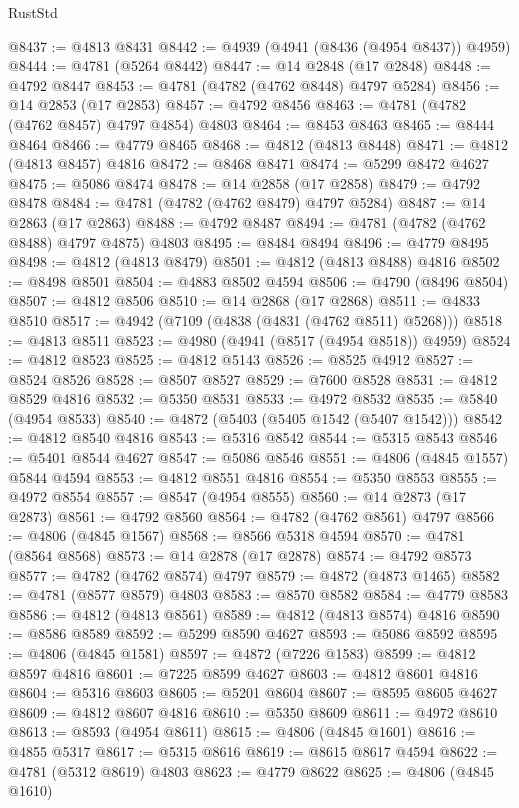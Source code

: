 \begin{lexlean}{RustStd}
\begin{coremodule}
@8437 := @4813 @8431
@8442 := @4939 (@4941 (@8436 (@4954 @8437)) @4959)
@8444 := @4781 (@5264 @8442)
@8447 := @14 @2848 (@17 @2848)
@8448 := @4792 @8447
@8453 := @4781 (@4782 (@4762 @8448) @4797 @5284)
@8456 := @14 @2853 (@17 @2853)
@8457 := @4792 @8456
@8463 := @4781 (@4782 (@4762 @8457) @4797 @4854) @4803
@8464 := @8453 @8463
@8465 := @8444 @8464
@8466 := @4779 @8465
@8468 := @4812 (@4813 @8448)
@8471 := @4812 (@4813 @8457) @4816
@8472 := @8468 @8471
@8474 := @5299 @8472 @4627
@8475 := @5086 @8474
@8478 := @14 @2858 (@17 @2858)
@8479 := @4792 @8478
@8484 := @4781 (@4782 (@4762 @8479) @4797 @5284)
@8487 := @14 @2863 (@17 @2863)
@8488 := @4792 @8487
@8494 := @4781 (@4782 (@4762 @8488) @4797 @4875) @4803
@8495 := @8484 @8494
@8496 := @4779 @8495
@8498 := @4812 (@4813 @8479)
@8501 := @4812 (@4813 @8488) @4816
@8502 := @8498 @8501
@8504 := @4883 @8502 @4594
@8506 := @4790 (@8496 @8504)
@8507 := @4812 @8506
@8510 := @14 @2868 (@17 @2868)
@8511 := @4833 @8510
@8517 := @4942 (@7109 (@4838 (@4831 (@4762 @8511) @5268)))
@8518 := @4813 @8511
@8523 := @4980 (@4941 (@8517 (@4954 @8518)) @4959)
@8524 := @4812 @8523
@8525 := @4812 @5143
@8526 := @8525 @4912
@8527 := @8524 @8526
@8528 := @8507 @8527
@8529 := @7600 @8528
@8531 := @4812 @8529 @4816
@8532 := @5350 @8531
@8533 := @4972 @8532
@8535 := @5840 (@4954 @8533)
@8540 := @4872 (@5403 (@5405 @1542 (@5407 @1542)))
@8542 := @4812 @8540 @4816
@8543 := @5316 @8542
@8544 := @5315 @8543
@8546 := @5401 @8544 @4627
@8547 := @5086 @8546
@8551 := @4806 (@4845 @1557) @5844 @4594
@8553 := @4812 @8551 @4816
@8554 := @5350 @8553
@8555 := @4972 @8554
@8557 := @8547 (@4954 @8555)
@8560 := @14 @2873 (@17 @2873)
@8561 := @4792 @8560
@8564 := @4782 (@4762 @8561) @4797
@8566 := @4806 (@4845 @1567)
@8568 := @8566 @5318 @4594
@8570 := @4781 (@8564 @8568)
@8573 := @14 @2878 (@17 @2878)
@8574 := @4792 @8573
@8577 := @4782 (@4762 @8574) @4797
@8579 := @4872 (@4873 @1465)
@8582 := @4781 (@8577 @8579) @4803
@8583 := @8570 @8582
@8584 := @4779 @8583
@8586 := @4812 (@4813 @8561)
@8589 := @4812 (@4813 @8574) @4816
@8590 := @8586 @8589
@8592 := @5299 @8590 @4627
@8593 := @5086 @8592
@8595 := @4806 (@4845 @1581)
@8597 := @4872 (@7226 @1583)
@8599 := @4812 @8597 @4816
@8601 := @7225 @8599 @4627
@8603 := @4812 @8601 @4816
@8604 := @5316 @8603
@8605 := @5201 @8604
@8607 := @8595 @8605 @4627
@8609 := @4812 @8607 @4816
@8610 := @5350 @8609
@8611 := @4972 @8610
@8613 := @8593 (@4954 @8611)
@8615 := @4806 (@4845 @1601)
@8616 := @4855 @5317
@8617 := @5315 @8616
@8619 := @8615 @8617 @4594
@8622 := @4781 (@5312 @8619) @4803
@8623 := @4779 @8622
@8625 := @4806 (@4845 @1610)

\end{coremodule}
\end{lexlean}
